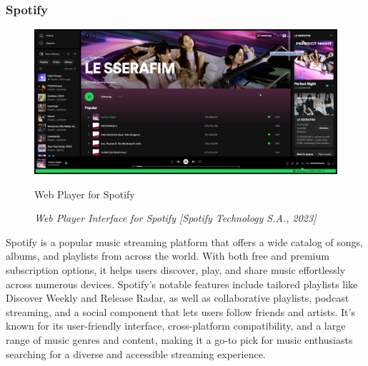 \subsubsection{Spotify}
\begin{figure}[h]
    \centering
    \includegraphics[width=1.0\linewidth]{mainmatter/images/musicplat2.png}
    \caption{Web Player for Spotify}
    \caption*{\textit{Web Player Interface for Spotify [Spotify Technology S.A., 2023]}}
    \label{fig:myfig7}
\end{figure}
Spotify is a popular music streaming platform that offers a wide catalog of songs, albums, and playlists from across the world. With both free and premium subscription options, it helps users discover, play, and share music effortlessly across numerous devices. Spotify's notable features include tailored playlists like Discover Weekly and Release Radar, as well as collaborative playlists, podcast streaming, and a social component that lets users follow friends and artists. It's known for its user-friendly interface, cross-platform compatibility, and a large range of music genres and content, making it a go-to pick for music enthusiasts searching for a diverse and accessible streaming experience. \pagebreak

